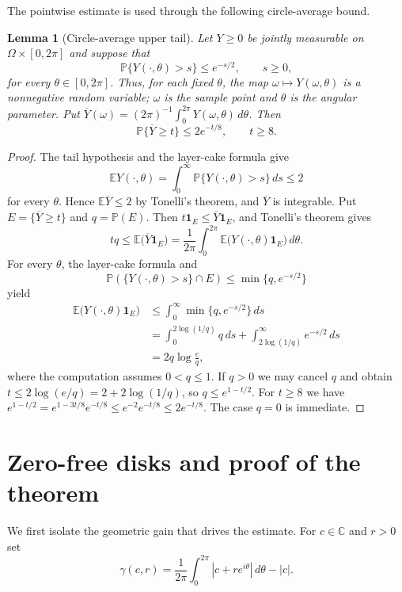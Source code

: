 \documentclass[plain]{baustms}
\newcommand{\C}{\mathbb C}
\newcommand{\Pp}{\mathbb P}
\newcommand{\E}{\mathbb E}
\newcommand{\ind}{\mathbf 1}
\theoremstyle{cupthm}
\newtheorem{lemma}[theorem]{Lemma}
\begin{document}
The pointwise estimate is used through the following circle-average bound.

\begin{lemma}[Circle-average upper tail]\label{lem:circle-tail}
Let $Y\geq0$ be jointly measurable on $\Omega\times[0,2\pi]$ and suppose that
\[
 \Pp\{Y(\cdot,\theta)>s\}\leq e^{-s/2},\qquad s\geq0,
\]
for every $\theta\in[0,2\pi]$. Thus, for each fixed $\theta$, the map
$\omega\mapsto Y(\omega,\theta)$ is a nonnegative random variable; $\omega$ is
the sample point and $\theta$ is the angular parameter. Put
$\overline Y(\omega)=(2\pi)^{-1}\int_0^{2\pi}Y(\omega,\theta)\,d\theta$. Then
\[
 \Pp\{\overline Y\geq t\}\leq2e^{-t/8},\qquad t\geq8.
\]
\end{lemma}

\begin{proof}
The tail hypothesis and the layer-cake formula give
\[
 \E Y(\cdot,\theta)
 =\int_0^\infty\Pp\{Y(\cdot,\theta)>s\}\,ds\leq2
\]
for every $\theta$. Hence $\E\overline Y\leq2$ by Tonelli's theorem, and
$\overline Y$ is integrable. Put $E=\{\overline Y\geq t\}$ and $q=\Pp(E)$. Then
$t\ind_E\leq\overline Y\ind_E$, and Tonelli's theorem gives
\[
 tq\leq\E\bigl(\overline Y\ind_E\bigr)
 =\frac1{2\pi}\int_0^{2\pi}\E\bigl(Y(\cdot,\theta)\ind_E\bigr)\,d\theta.
\]
For every $\theta$, the layer-cake formula and
\[
 \Pp(\{Y(\cdot,\theta)>s\}\cap E)
 \leq\min\{q,e^{-s/2}\}
\]
yield
\begin{align*}
 \E\bigl(Y(\cdot,\theta)\ind_E\bigr)
 &\leq\int_0^\infty\min\{q,e^{-s/2}\}\,ds\\
 &=\int_0^{2\log(1/q)}q\,ds
   +\int_{2\log(1/q)}^\infty e^{-s/2}\,ds\\
 &=2q\log\frac eq,
\end{align*}
where the computation assumes $0<q\leq1$. If $q>0$ we may cancel $q$ and
obtain $t\leq2\log(e/q)=2+2\log(1/q)$, so $q\leq e^{1-t/2}$. For $t\geq8$ we
have $e^{1-t/2}=e^{1-3t/8}e^{-t/8}\leq e^{-2}e^{-t/8}\leq2e^{-t/8}$. The case
$q=0$ is immediate.
\end{proof}

\section{Zero-free disks and proof of the theorem}\label{sec:holes}

We first isolate the geometric gain that drives the estimate. For $c\in\C$
and $r>0$ set
\[
 \gamma(c,r)=\frac1{2\pi}\int_0^{2\pi}|c+re^{i\theta}|\,d\theta-|c|.
\]
\end{document}
